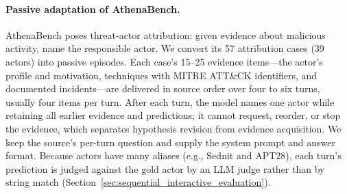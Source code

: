 \paragraph{Passive adaptation of AthenaBench.}
AthenaBench poses threat-actor attribution: given evidence about malicious activity, name the responsible actor. We convert its 57 attribution cases (39 actors) into passive episodes. Each case's 15--25 evidence items---the actor's profile and motivation, techniques with MITRE ATT\&CK identifiers, and documented incidents---are delivered in source order over four to six turns, usually four items per turn. After each turn, the model names one actor while retaining all earlier evidence and predictions; it cannot request, reorder, or stop the evidence, which separates hypothesis revision from evidence acquisition. We keep the source's per-turn question and supply the system prompt and answer format. Because actors have many aliases (e.g., Sednit and APT28), each turn's prediction is judged against the gold actor by an LLM judge rather than by string match (Section~\ref{sec:sequential_interactive_evaluation}).
